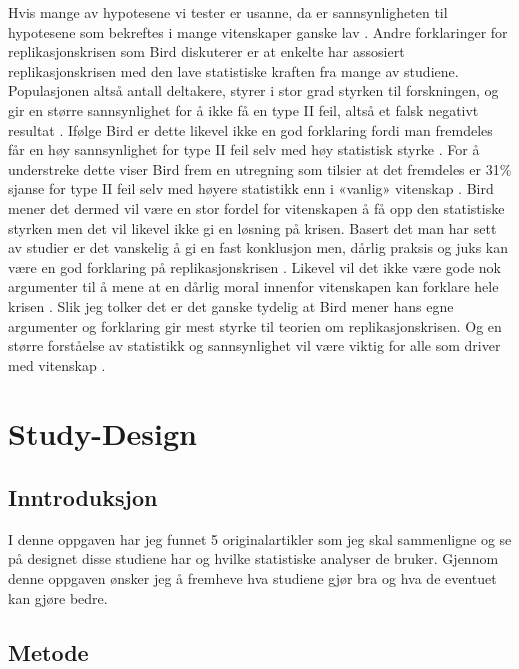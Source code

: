 \documentclass[
]{book}
\begin{document}
Hvis mange av hypotesene vi tester er usanne, da er sannsynligheten til hypotesene som bekreftes i mange vitenskaper ganske lav \citet{bird2020}.
Andre forklaringer for replikasjonskrisen som Bird diskuterer er at enkelte har assosiert replikasjonskrisen med den lave statistiske kraften fra mange av studiene.
Populasjonen altså antall deltakere, styrer i stor grad styrken til forskningen, og gir en større sannsynlighet for å ikke få en type II feil, altså et falsk negativt resultat \citet{bird2020}.
Ifølge Bird er dette likevel ikke en god forklaring fordi man fremdeles får en høy sannsynlighet for type II feil selv med høy statistisk styrke \citet{bird2020}.
For å understreke dette viser Bird frem en utregning som tilsier at det fremdeles er 31\% sjanse for type II feil selv med høyere statistikk enn i «vanlig» vitenskap \citet{bird2020}.
Bird mener det dermed vil være en stor fordel for vitenskapen å få opp den statistiske styrken men det vil likevel ikke gi en løsning på krisen.
Basert det man har sett av studier er det vanskelig å gi en fast konklusjon men, dårlig praksis og juks kan være en god forklaring på replikasjonskrisen \citet{bird2020}.
Likevel vil det ikke være gode nok argumenter til å mene at en dårlig moral innenfor vitenskapen kan forklare hele krisen \citet{bird2020}.
Slik jeg tolker det er det ganske tydelig at Bird mener hans egne argumenter og forklaring gir mest styrke til teorien om replikasjonskrisen.
Og en større forståelse av statistikk og sannsynlighet vil være viktig for alle som driver med vitenskap \citet{bird2020}.

\hypertarget{study-design}{%
\chapter{Study-Design}\label{study-design}}

\hypertarget{inntroduksjon}{%
\section{Inntroduksjon}\label{inntroduksjon}}

I denne oppgaven har jeg funnet 5 originalartikler \citep{billat2000, billat2001, dupont2002, thevenet2007, wakefield2009} som jeg skal sammenligne og se på designet disse studiene har og hvilke statistiske analyser de bruker. Gjennom denne oppgaven ønsker jeg å fremheve hva studiene gjør bra og hva de eventuet kan gjøre bedre.

\hypertarget{metode-1}{%
\section{Metode}\label{metode-1}}
\end{document}
